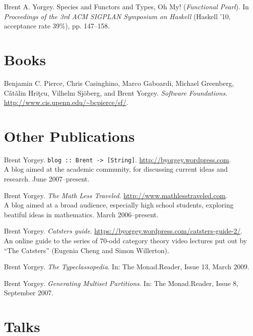 \documentclass[12pt]{article}
\newcommand{\cvitem}{\par\hangpara{2em}{1}}
\begin{document}
\cvitem Brent A. Yorgey. Species and Functors and Types, Oh
  My! (\emph{Functional Pearl}). In \emph{Proceedings of the 3rd ACM SIGPLAN
  Symposium on Haskell} (Haskell '10, acceptance rate 39\%), pp. 147--158.

\section*{Books}
\cvitem Benjamin C. Pierce, Chris Casinghino, Marco Gaboardi, Michael Greenberg,
C{\v a}t{\v a}lin Hri{\c t}cu, Vilhelm Sj\"oberg, and Brent Yorgey. \emph{Software
  Foundations}. \url{http://www.cis.upenn.edu/~bcpierce/sf/}.

\section*{Other Publications}
\cvitem Brent Yorgey. \texttt{blog :: Brent ->
  [String]}. \url{http://byorgey.wordpress.com}.  \\
A blog aimed at the academic community, for discussing current ideas
and research.  June 2007--present.

\cvitem Brent Yorgey. \emph{The Math Less
  Traveled}. \url{http://www.mathlesstraveled.com}. \\
A blog aimed at a broad audience, especially high school students,
exploring beatiful ideas in mathematics.  March 2006--present.

\cvitem Brent Yorgey. \emph{Catsters
  guide}. \url{https://byorgey.wordpress.com/catsters-guide-2/}. \\
An online guide to the series of 70-odd category theory video lectures
put out by ``The Catsters'' (Eugenia Cheng and Simon Willerton).

\cvitem Brent Yorgey. \emph{The Typeclassopedia}. In: The
Monad.Reader, Issue 13, March 2009.

\cvitem Brent Yorgey. \emph{Generating Multiset Partitions}.  In: The
Monad.Reader, Issue 8, September 2007.


\section*{Talks}
\end{document}
